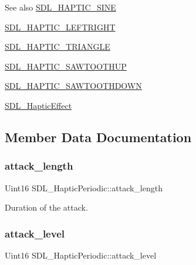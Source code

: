 \begin{DoxySeeAlso}{See also}
\hyperlink{SDL__haptic_8h_aa6d75adbfcdda5075078e7a2849da5c0}{S\+D\+L\+\_\+\+H\+A\+P\+T\+I\+C\+\_\+\+S\+I\+NE} 

\hyperlink{SDL__haptic_8h_ae047624d8458ff6400887c37a36f86d3}{S\+D\+L\+\_\+\+H\+A\+P\+T\+I\+C\+\_\+\+L\+E\+F\+T\+R\+I\+G\+HT} 

\hyperlink{SDL__haptic_8h_ae8123eaa51511507375ba6ef9220fa46}{S\+D\+L\+\_\+\+H\+A\+P\+T\+I\+C\+\_\+\+T\+R\+I\+A\+N\+G\+LE} 

\hyperlink{SDL__haptic_8h_ab8e3f40f3c2bcee8905d13b634363c3f}{S\+D\+L\+\_\+\+H\+A\+P\+T\+I\+C\+\_\+\+S\+A\+W\+T\+O\+O\+T\+H\+UP} 

\hyperlink{SDL__haptic_8h_afd64aa747034a7ccf4b55f6246525701}{S\+D\+L\+\_\+\+H\+A\+P\+T\+I\+C\+\_\+\+S\+A\+W\+T\+O\+O\+T\+H\+D\+O\+WN} 

\hyperlink{unionSDL__HapticEffect}{S\+D\+L\+\_\+\+Haptic\+Effect} 
\end{DoxySeeAlso}


\subsection{Member Data Documentation}
\mbox{\label{structSDL__HapticPeriodic_ab35eedce7107edc75640586159fe75bb}} 
\subsubsection{\texorpdfstring{attack\+\_\+length}{attack\_length}}
{\footnotesize\ttfamily Uint16 S\+D\+L\+\_\+\+Haptic\+Periodic\+::attack\+\_\+length}

Duration of the attack. \mbox{\label{structSDL__HapticPeriodic_a79fc2217fea6db6ab3d89ad905d52ccb}} 
\subsubsection{\texorpdfstring{attack\+\_\+level}{attack\_level}}
{\footnotesize\ttfamily Uint16 S\+D\+L\+\_\+\+Haptic\+Periodic\+::attack\+\_\+level}

